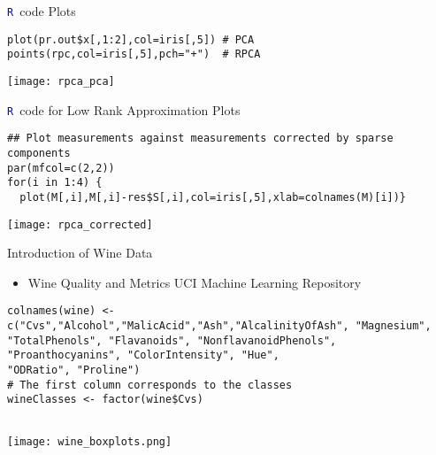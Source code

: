\documentclass[notes=show]{beamer}
\newcommand \bit  {\begin{itemize}}
\newcommand \eit  {\end{itemize}}
\newcommand{\textR}[1]{\textcolor{blue}{\texttt{#1}}}
\newcommand{\R}{\textR{R}}
\begin{document}
\begin{frame}[fragile]{\R \, code Plots}

{\tiny
\begin{Verbatim}[formatcom=\color{blue}]
plot(pr.out$x[,1:2],col=iris[,5]) # PCA
points(rpc,col=iris[,5],pch="+")  # RPCA
\end{Verbatim}

\texttt{[image: rpca\_pca]}

}

 
\end{frame}



\begin{frame}[fragile]{\R \, code for Low Rank Approximation Plots}

{\tiny
\begin{Verbatim}[formatcom=\color{blue}]
## Plot measurements against measurements corrected by sparse components
par(mfcol=c(2,2))
for(i in 1:4) {
  plot(M[,i],M[,i]-res$S[,i],col=iris[,5],xlab=colnames(M)[i])}
\end{Verbatim}

\texttt{[image: rpca\_corrected]}

}

 
\end{frame}

\begin{frame}[fragile]{Introduction of Wine Data}

\bit
\item Wine Quality and Metrics UCI Machine Learning Repository
\eit
\vspace{.25cm}
{\tiny
\begin{Verbatim}[formatcom=\color{blue}]
colnames(wine) <- c("Cvs","Alcohol","MalicAcid","Ash","AlcalinityOfAsh", "Magnesium", 
"TotalPhenols", "Flavanoids", "NonflavanoidPhenols", "Proanthocyanins", "ColorIntensity", "Hue", 
"ODRatio", "Proline")
# The first column corresponds to the classes
wineClasses <- factor(wine$Cvs)


\end{Verbatim}
}
\vspace{-.5cm}
\hspace{-.5cm}
\texttt{[image: wine\_boxplots.png]}

 
\end{frame}
\end{document}
